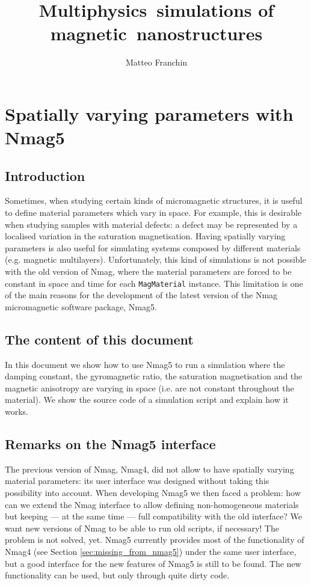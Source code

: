 \documentclass[11pt,oneside,openany]{article}
\author{Matteo Franchin}
\title{Multiphysics~simulations of magnetic~nanostructures}
\begin{document}
\titlepage

\section{Spatially varying parameters with Nmag5}

\subsection{Introduction}
Sometimes, when studying certain kinds of micromagnetic structures, it is
useful to define material parameters which vary in space. For example, this is
desirable when studying samples with material defects: a defect may be
represented by a localised variation in the saturation magnetisation.  Having
spatially varying parameters is also useful for simulating systems composed by
different materials (e.g. magnetic multilayers).
Unfortunately, this kind of simulations is not possible with the old version of
Nmag, where the material parameters are forced to be constant in space and time
for each \verb|MagMaterial| instance. This limitation is one of the main
reasons for the development of the latest version of the Nmag micromagnetic
software package, Nmag5.

\subsection{The content of this document}
In this document we show how to use Nmag5 to run a simulation where the damping
constant, the gyromagnetic ratio, the saturation magnetisation and the magnetic
anisotropy are varying in space (i.e. are not constant throughout the
material).  We show the source code of a simulation script and explain how it
works.

\subsection{Remarks on the Nmag5 interface}
The previous version of Nmag, Nmag4, did not allow to have spatially varying
material parameters: its user interface was designed without taking this
possibility into account. When developing Nmag5 we then faced a problem: how
can we extend the Nmag interface to allow defining non-homogeneous materials
but keeping --- at the same time --- full compatibility with the old interface?
We want new versions of Nmag to be able to run old scripts, if necessary! The
problem is not solved, yet. Nmag5 currently provides most of the functionality
of Nmag4 (see Section \ref{sec:missing_from_nmag5}) under the same user
interface, but a good interface for the new features of Nmag5 is still to be
found.  The new functionality can be used, but only through quite dirty code.
\end{document}
